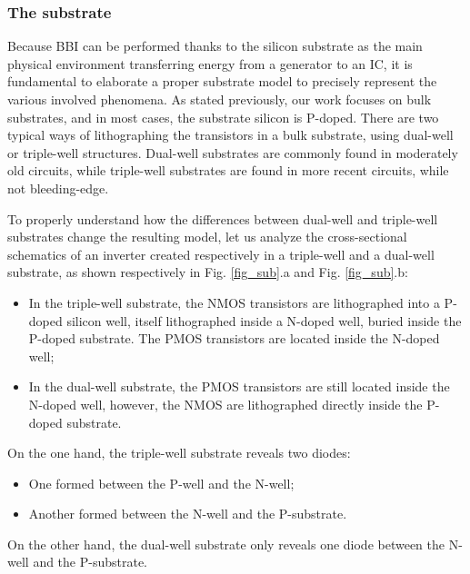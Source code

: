 	\subsubsection{The substrate}
		
		Because BBI can be performed thanks to the silicon substrate as the main physical environment transferring energy from a generator to an IC, it is fundamental to elaborate a proper substrate model to precisely represent the various involved phenomena.
		As stated previously, our work focuses on bulk substrates, and in most cases, the substrate silicon is P-doped.
		There are two typical ways of lithographing the transistors in a bulk substrate, using dual-well or triple-well structures.
		Dual-well substrates are commonly found in moderately old circuits, while triple-well substrates are found in more recent circuits, while not bleeding-edge.

		To properly understand how the differences between dual-well and triple-well substrates change the resulting model, let us analyze the cross-sectional schematics of an inverter created respectively in a triple-well and a dual-well substrate, as shown respectively in Fig. \ref{fig_sub}.a and Fig. \ref{fig_sub}.b:
		\begin{itemize}
			\item In the triple-well substrate, the NMOS transistors are lithographed into a P-doped silicon well, itself lithographed inside a N-doped well, buried inside the P-doped substrate. The PMOS transistors are located inside the N-doped well;
			\item In the dual-well substrate, the PMOS transistors are still located inside the N-doped well, however, the NMOS are lithographed directly inside the P-doped substrate.
		\end{itemize}
		On the one hand, the triple-well substrate reveals two diodes:
		\begin{itemize}
			\item One formed between the P-well and the N-well;
			\item Another formed between the N-well and the P-substrate.
		\end{itemize}
		On the other hand, the dual-well substrate only reveals one diode between the N-well and the P-substrate.

